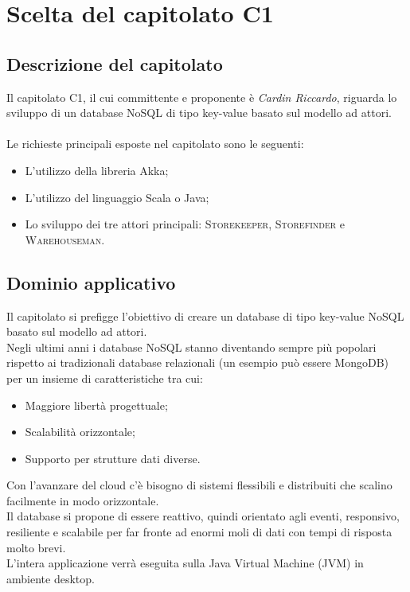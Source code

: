 \documentclass[a4paper]{article}
\begin{document}
	\newpage	
	\section{Scelta del capitolato C1}
		\subsection{Descrizione del capitolato}
			Il capitolato C1, il cui committente e proponente è \emph{Cardin Riccardo}, riguarda lo sviluppo 
			di un database NoSQL di tipo key-value basato sul modello ad attori.
			\\ \\
			Le richieste principali esposte nel capitolato sono le seguenti:
			\begin{itemize}
				\item L'utilizzo della libreria Akka;
				\item L'utilizzo del linguaggio Scala o Java;
				\item Lo sviluppo dei tre attori principali: \textsc{Storekeeper},
				 \textsc{Storefinder} e \textsc{Warehouseman}.
			\end{itemize}
		\subsection{Dominio applicativo}
			Il capitolato si prefigge l'obiettivo di creare un database di tipo key-value NoSQL basato sul
			modello ad attori. \\
			Negli ultimi anni i database NoSQL stanno diventando sempre più popolari  rispetto ai tradizionali
			database relazionali (un esempio può essere MongoDB) per un insieme di caratteristiche tra cui: 
			\begin{itemize}
				\item Maggiore libertà progettuale;
				\item Scalabilità orizzontale;
				\item Supporto per strutture dati diverse.
			\end{itemize}
			Con l'avanzare del cloud c'è bisogno di sistemi flessibili e distribuiti che scalino facilmente in modo
			orizzontale. \\
			Il database si propone di essere reattivo, quindi orientato agli eventi, responsivo, resiliente e
			scalabile per far fronte ad enormi moli di dati con tempi di risposta molto brevi. \\
			L'intera applicazione verrà eseguita sulla Java Virtual Machine (JVM) in ambiente
			 desktop.
\end{document}
